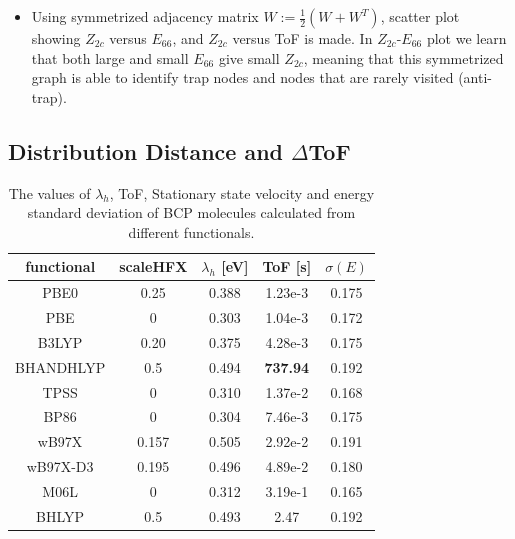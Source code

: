 \documentclass[letterpaper,12pt]{article}
\begin{document}
\begin{itemize}
    \item Using symmetrized adjacency matrix $W := \frac{1}{2}(W+W^T)$, scatter plot showing $Z_{2c}$ versus $E_{66}$, and $Z_{2c}$ versus ToF is made. In $Z_{2c}$-$E_{66}$ plot we learn that both large and small $E_{66}$ give small $Z_{2c}$, meaning that this symmetrized graph is able to identify trap nodes and nodes that are rarely visited (anti-trap).
\end{itemize}

\subsection{Distribution Distance and  $\Delta$ToF}
\begin{table}[h]
    \centering
    \begin{tabular}{c c c c c }
    \hline
        functional & scaleHFX & $\lambda_h$ [eV]   & ToF [s]  & $\sigma(E)$ \\ 
        \hline
        PBE0 & 0.25 & 0.388 & 1.23e-3  & 0.175 \\
        PBE & 0 & 0.303  & 1.04e-3  & 0.172 \\ 
        B3LYP & 0.20 & 0.375  & 4.28e-3  & 0.175 \\
        BHANDHLYP & 0.5 & 0.494  &\textbf{737.94}  & 0.192 \\
        TPSS & 0 & 0.310  &1.37e-2 &  0.168 \\
        BP86 & 0 & 0.304  & 7.46e-3 & 0.175 \\
        wB97X & 0.157 & 0.505 & 2.92e-2  & 0.191 \\
        wB97X-D3 & 0.195 & 0.496 & 4.89e-2  & 0.180 \\
        M06L & 0 & 0.312 & 3.19e-1  & 0.165 \\
        BHLYP & 0.5 & 0.493 &  2.47 & 0.192 \\
    \hline
    \end{tabular}
    \caption{ The values of $\lambda_h$, ToF, Stationary state velocity and energy standard deviation of BCP molecules calculated from different functionals. }
    \label{tab:para}
\end{table}
\end{document}

